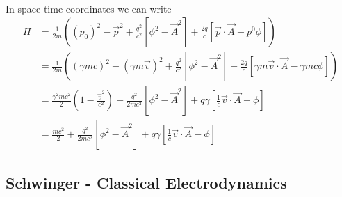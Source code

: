 \documentclass[10pt,a4paper]{book}
\theoremstyle{definition}
\begin{document}
\begin{enumerate}
\begin{align}
\end{align}
In space-time coordinates we can write
\begin{align}
H&=\frac{1}{2m}\left((p_0)^2-\vec{p}^2+\frac{q^2}{c^2}[\phi^2-\vec{A}^2]+\frac{2q}{c}[\vec{p}\cdot\vec{A}-p^0\phi]\right)\\
&=\frac{1}{2m}\left((\gamma m c)^2-(\gamma m\vec{v})^2+\frac{q^2}{c^2}[\phi^2-\vec{A}^2]+\frac{2q}{c}[\gamma m\vec{v}\cdot\vec{A}-\gamma m c\phi]\right)\\
&=\frac{\gamma^2mc^2}{2}\left(1-\frac{\vec{v}^2}{c^2}\right)+\frac{q^2}{2mc^2}[\phi^2-\vec{A}^2]+q\gamma[\frac{1}{c}\vec{v}\cdot\vec{A}- \phi]\\
&=\frac{mc^2}{2}+\frac{q^2}{2mc^2}[\phi^2-\vec{A}^2]+q\gamma[\frac{1}{c}\vec{v}\cdot\vec{A}- \phi]
\end{align}
\end{enumerate}

\subsection{{\sc Schwinger} - Classical Electrodynamics}
\end{document}
